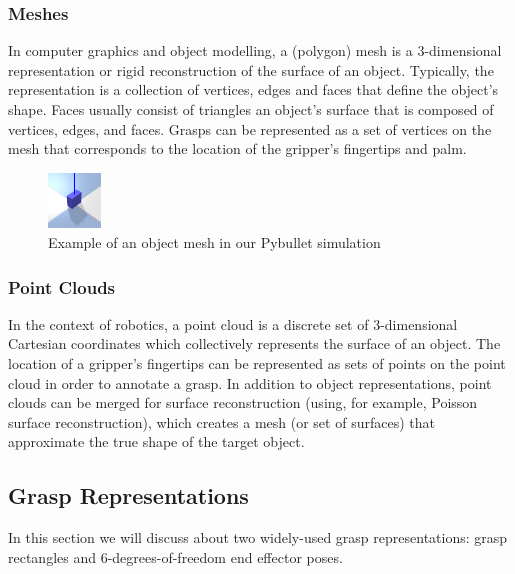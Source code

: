 \documentclass[11pt, a4paper]{report}
\begin{document}
\subsubsection{Meshes}\label{sec:2.1.1.2}
In computer graphics and object modelling, a (polygon) mesh is a 3-dimensional representation or rigid reconstruction of the surface of an object. Typically, the representation is a collection of vertices, edges and faces that define the object's shape. Faces usually consist of triangles an object's surface that is composed of vertices, edges, and faces. Grasps can be represented as a set of vertices on the mesh that corresponds to the location of the gripper's fingertips and palm.
\begin{figure}[H]
    \centering
    \includegraphics[width=0.125\textwidth]{docs/Project Report/Media/block1.png}
    \caption{Example of an object mesh in our Pybullet simulation}
    \label{fig:2.2}
\end{figure}

\subsubsection{Point Clouds}\label{sec:2.1.1.3}
In the context of robotics, a point cloud is a discrete set of 3-dimensional Cartesian coordinates which collectively represents the surface of an object. The location of a gripper's fingertips can be represented as sets of points on the point cloud in order to annotate a grasp. In addition to object representations, point clouds can be merged for surface reconstruction (using, for example, Poisson surface reconstruction), which creates a mesh (or set of surfaces) that approximate the true shape of the target object.


\subsection{Grasp Representations}\label{sec:2.1.2}
In this section we will discuss about two widely-used grasp representations: grasp rectangles and 6-degrees-of-freedom end effector poses.
\end{document}
